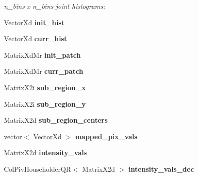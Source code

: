 \begin{DoxyCompactItemize}
\begin{DoxyCompactList}\small\item\em n\-\_\-bins x n\-\_\-bins joint histograms; \end{DoxyCompactList}\item 
\hypertarget{classLSCV_a999a850e571de3ae5b1d7ddc1a92ba72}{Vector\-Xd {\bfseries init\-\_\-hist}}\label{classLSCV_a999a850e571de3ae5b1d7ddc1a92ba72}

\item 
\hypertarget{classLSCV_ad38d6bcbfd496e233cfa4eeb730cbce0}{Vector\-Xd {\bfseries curr\-\_\-hist}}\label{classLSCV_ad38d6bcbfd496e233cfa4eeb730cbce0}

\item 
\hypertarget{classLSCV_a5c9c99e6d15aea959d4e1e2a78146eda}{Matrix\-Xd\-Mr {\bfseries init\-\_\-patch}}\label{classLSCV_a5c9c99e6d15aea959d4e1e2a78146eda}

\item 
\hypertarget{classLSCV_a2ca2494fab8f5b7f66e761ee83ca4e07}{Matrix\-Xd\-Mr {\bfseries curr\-\_\-patch}}\label{classLSCV_a2ca2494fab8f5b7f66e761ee83ca4e07}

\item 
\hypertarget{classLSCV_a7f4d431ae4ec088c7783ef45aa9ee074}{Matrix\-X2i {\bfseries sub\-\_\-region\-\_\-x}}\label{classLSCV_a7f4d431ae4ec088c7783ef45aa9ee074}

\item 
\hypertarget{classLSCV_a8e5f263eebe169a1318a3330110e568a}{Matrix\-X2i {\bfseries sub\-\_\-region\-\_\-y}}\label{classLSCV_a8e5f263eebe169a1318a3330110e568a}

\item 
\hypertarget{classLSCV_a70f30391f51fbc2ec7ce7119e5105f06}{Matrix\-X2d {\bfseries sub\-\_\-region\-\_\-centers}}\label{classLSCV_a70f30391f51fbc2ec7ce7119e5105f06}

\item 
\hypertarget{classLSCV_a14116682d6864d5d54e8ab9bca922813}{vector$<$ Vector\-Xd $>$ {\bfseries mapped\-\_\-pix\-\_\-vals}}\label{classLSCV_a14116682d6864d5d54e8ab9bca922813}

\item 
\hypertarget{classLSCV_a9af964d9e9224dae235d5fc3f8bd22ee}{Matrix\-X2d {\bfseries intensity\-\_\-vals}}\label{classLSCV_a9af964d9e9224dae235d5fc3f8bd22ee}

\item 
\hypertarget{classLSCV_a67ce3ed6f30204e8c4e0d9c3208c3d94}{Col\-Piv\-Householder\-Q\-R$<$ Matrix\-X2d $>$ {\bfseries intensity\-\_\-vals\-\_\-dec}}\label{classLSCV_a67ce3ed6f30204e8c4e0d9c3208c3d94}


\end{DoxyCompactItemize}
